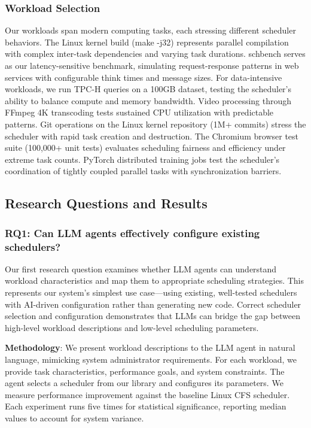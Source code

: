 \subsubsection{Workload Selection}
Our workloads span modern computing tasks, each stressing different scheduler behaviors. The Linux kernel build (make -j32) represents parallel compilation with complex inter-task dependencies and varying task durations. schbench serves as our latency-sensitive benchmark, simulating request-response patterns in web services with configurable think times and message sizes. For data-intensive workloads, we run TPC-H queries on a 100GB dataset, testing the scheduler's ability to balance compute and memory bandwidth. Video processing through FFmpeg 4K transcoding tests sustained CPU utilization with predictable patterns. Git operations on the Linux kernel repository (1M+ commits) stress the scheduler with rapid task creation and destruction. The Chromium browser test suite (100,000+ unit tests) evaluates scheduling fairness and efficiency under extreme task counts. PyTorch distributed training jobs test the scheduler's coordination of tightly coupled parallel tasks with synchronization barriers.

\subsection{Research Questions and Results}

\subsubsection{RQ1: Can LLM agents effectively configure existing schedulers?}

Our first research question examines whether LLM agents can understand workload characteristics and map them to appropriate scheduling strategies. This represents our system's simplest use case—using existing, well-tested schedulers with AI-driven configuration rather than generating new code. Correct scheduler selection and configuration demonstrates that LLMs can bridge the gap between high-level workload descriptions and low-level scheduling parameters.

\textbf{Methodology}: We present workload descriptions to the LLM agent in natural language, mimicking system administrator requirements. For each workload, we provide task characteristics, performance goals, and system constraints. The agent selects a scheduler from our library and configures its parameters. We measure performance improvement against the baseline Linux CFS scheduler. Each experiment runs five times for statistical significance, reporting median values to account for system variance.

